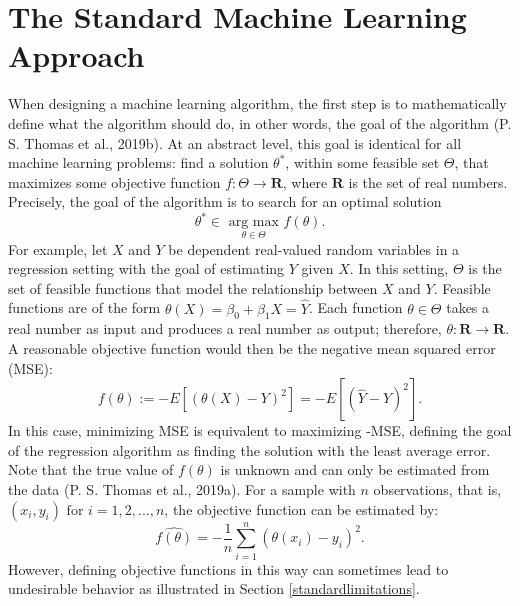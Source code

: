 \documentclass[12pt, twoside]{amherstthesis}
\begin{document}
\hypertarget{standardml}{%
\section{The Standard Machine Learning Approach}\label{standardml}}

When designing a machine learning algorithm, the first step is to mathematically define what the algorithm should do, in other words, the goal of the algorithm (P. S. Thomas et al., 2019b). At an abstract level, this goal is identical for all machine learning problems: find a solution \(\theta^*\), within some feasible set \(\Theta\), that maximizes some objective function \(f: \Theta \rightarrow \textbf{R}\), where \(\textbf{R}\) is the set of real numbers. Precisely, the goal of the algorithm is to search for an optimal solution
\begin{equation}
\label{ch2eq1}
\theta^* \in \underset{\theta \in \Theta}{\text{ arg max }} f(\theta).
\end{equation}
For example, let \(X\) and \(Y\) be dependent real-valued random variables in a regression setting with the goal of estimating \(Y\) given \(X\). In this setting, \(\Theta\) is the set of feasible functions that model the relationship between \(X\) and \(Y\). Feasible functions are of the form \(\theta(X) = \beta_0 + \beta_1X = \hat{Y}\). Each function \(\theta \in \Theta\) takes a real number as input and produces a real number as output; therefore, \(\theta : \textbf{R} \rightarrow \textbf{R}\). A reasonable objective function would then be the negative mean squared error (MSE):
\begin{equation}
\label{ch2eq2}
f(\theta):=-E[(\theta(X) - Y)^2] = -E[(\hat{Y}-Y)^2].
\end{equation}
In this case, minimizing MSE is equivalent to maximizing -MSE, defining the goal of the regression algorithm as finding the solution with the least average error. Note that the true value of \(f(\theta)\) is unknown and can only be estimated from the data (P. S. Thomas et al., 2019a). For a sample with \(n\) observations, that is, \((x_i, y_i) \text{ for } i = 1,2,...,n\), the objective function can be estimated by:
\begin{equation}
\label{ch2eq3}
\hat{f(\theta)}= -\frac{1}{n} \sum_{i=1}^{n}(\theta(x_i) - y_i)^2.
\end{equation}
However, defining objective functions in this way can sometimes lead to undesirable behavior as illustrated in Section \ref{standardlimitations}.
\end{document}
